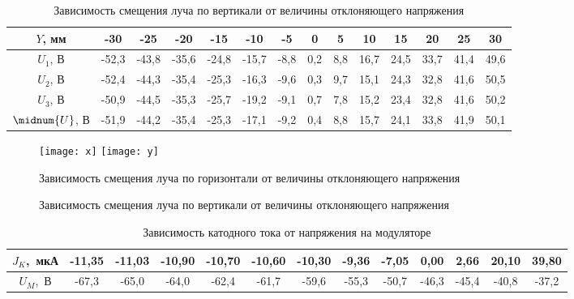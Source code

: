     \begin{table}[h!]
        \center
        \caption{Зависимость смещения луча по вертикали от величины
        отклоняющего напряжения}
        \begin{tabular}{|C{.08}|*{13}{C{.045}|}} \hline
            \( Y \), мм & -30 & -25 & -20 & -15 & -10 & -5 & 0 & 5 & 10 & 15
            & 20 & 25 & 30 \\ \hline
            \( U_1 \), В & -52,3 & -43,8 & -35,6 & -24,8 & -15,7 & -8,8 & 0,2
            & 8,8 & 16,7 & 24,5 & 33,7 & 41,4 & 49,6 \\ \hline
            \( U_2 \), В & -52,4 & -44,3 & -35,4 & -25,3 & -16,3 & -9,6 & 0,3
            & 9,7 & 15,1 & 24,3 & 32,8 & 41,6 & 50,5 \\ \hline
            \( U_3 \), В & -50,9 & -44,5 & -35,3 & -25,7 & -19,2 & -9,1 & 0,7
            & 7,8 & 15,2 & 23,4 & 32,8 & 41,6 & 50,2 \\ \hline
            \( \midnum{U} \), В & -51,9 & -44,2 & -35,4 & -25,3 & -17,1 & -9,2
            & 0,4 & 8,8 & 15,7 & 24,1 & 33,8 & 41,9 & 50,1 \\ \hline
        \end{tabular}
    \end{table}
    
    \begin{figure}[h!]
        \center
        \texttt{[image: x]} \hspace{2em}
        \texttt{[image: y]}
        \parbox{.45\textwidth}{\caption{Зависимость смещения луча по
        горизонтали от величины отклоняющего напряжения}} \hspace{2em}
        \parbox{.45\textwidth}{\caption{Зависимость смещения луча по
        вертикали от величины отклоняющего напряжения}}
    \end{figure}
    
    \pagebreak
    
    \begin{table}[h!]
        \center
        \caption{Зависимость катодного тока от напряжения на модуляторе}
        \begin{tabular}{|C{.064}|*{12}{C{.05}|}} \hline
            \( J_K \),~мкА & -11,35 & -11,03 & -10,90 & -10,70 & -10,60 & -10,30
            & -9,36 & -7,05 & 0,00 & 2,66 & 20,10 & 39,80 \\ \hline
            \( U_M \),~В & -67,3 & -65,0 & -64,0 & -62,4 & -61,7 & -59,6
            & -55,3 & -50,7 & -46,3 & -45,4 & -40,8 & -37,2 \\ \hline
        \end{tabular}
    \end{table}

